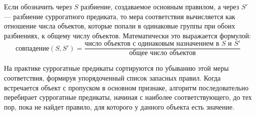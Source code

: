 Если обозначить через $S$ разбиение, создаваемое основным правилом, а через $S'$ — разбиение суррогатного предиката, то мера соответствия вычисляется как отношение числа объектов, которые попали в одинаковые группы при обоих разбиениях, к общему числу объектов. Математически это выражается формулой:
\[
\text{совпадение}(S, S') = \frac{\text{число объектов с одинаковым назначением в } S \text{ и } S'}{\text{общее число объектов}}
\]

На практике суррогатные предикаты сортируются по убыванию этой меры соответствия, формируя упорядоченный список запасных правил. Когда встречается объект с пропуском в основном признаке, алгоритм последовательно перебирает суррогатные предикаты, начиная с наиболее соответствующего, до тех пор, пока не найдет правило, для которого у данного объекта есть значение.
